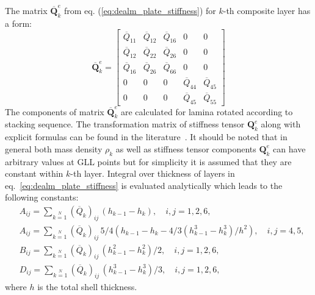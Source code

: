 \documentclass[preprint,12pt]{elsarticle}
\renewcommand{\bm}[1]{\mathbf{#1}}
\begin{document}
	The matrix $\bm{\overline Q}_k^e$ from eq. (\ref{eq:dealm_plate_stiffness}) for $k$-th composite layer has a form:
	\begin{equation}
	\bm{\overline Q}_k^e = \left[\begin{array}{ccccc} \overline{Q}_{11} & \overline{Q}_{12}& \overline{Q}_{16} & 0&0\\[2pt]
	\overline{Q}_{12}& \overline{Q}_{22} & \overline{Q}_{26}& 0&0\\\overline{Q}_{16}&\overline{Q}_{26}&\overline{Q}_{66}&0&0\\[2pt]
	0& 0 &0&\overline{Q}_{44}& \overline{Q}_{45}\\[2pt]
	0&0&0&\overline{Q}_{45}&\overline{Q}_{55}\end{array}\right] \label{eq:dealm_plate_stf}
	\end{equation}
	The components of matrix $\bm{\overline Q}_k^e$ are calculated for lamina rotated according to stacking sequence. The transformation matrix of stiffness tensor $\bm{Q}_k^e$ along with explicit formulas can be found in the literature~\cite{Vinson1987}.
	It should be noted that in general both mass density $\rho_k$ as well as stiffness tensor components $\bm{Q}_k^e$ can have arbitrary values at GLL points but for simplicity it is assumed that they are constant within $k$-th layer. Integral over thickness of layers in eq.~\ref{eq:dealm_plate_stiffness} is evaluated analytically which leads to the following constants:
	\begin{equation}
	\begin{split}
	& A_{ij} =  \sum \limits_{k=1}\limits^{N} (\overline{Q}_k)_{ij} \,(h_{k-1} - h_k),\quad i,j = 1,2,6,\\
	& A_{ij} =  \sum \limits_{k=1}\limits^{N} (\overline{Q}_k)_{ij} \,5/4 (h_{k-1} - h_k - 4/3 (h_{k-1}^3 - h_k^3)/h^2 ),\quad i,j = 4,5,\\
	& B_{ij} = \sum \limits_{k=1}\limits^{N}(\overline{Q}_k)_{ij} \,(h_{k-1}^2 - h_k^2)/2, \quad i,j = 1,2,6,\\
	& D_{ij} = \sum \limits_{k=1}\limits^{N}(\overline{Q}_k)_{ij} \,(h_{k-1}^3 - h_k^3)/3, \quad i,j = 1,2,6,
	\end{split}
	\end{equation}
	where $h$ is the total shell thickness.
\end{document}
